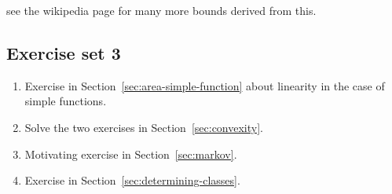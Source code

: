 \documentclass{article}
\begin{document}
 see the wikipedia page for many more bounds derived from this.  


\subsection{Exercise set 3}

\begin{enumerate}
	\item Exercise in Section~\ref{sec:area-simple-function} about  linearity in the case of simple functions.
	\item Solve the two exercises in Section~\ref{sec:convexity}.
	\item Motivating exercise in Section~\ref{sec:markov}.
	\item Exercise in Section~\ref{sec:determining-classes}.
\end{enumerate}
\end{document}
